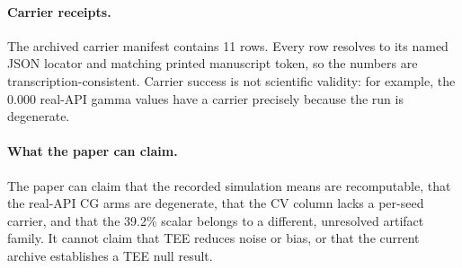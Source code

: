 \paragraph{Carrier receipts.}
The archived carrier manifest contains 11 rows. Every row resolves to its named
JSON locator and matching printed manuscript token, so the numbers are
transcription-consistent. Carrier success is not scientific validity: for
example, the $0.000$ real-API gamma values have a carrier precisely because the
run is degenerate.

\paragraph{What the paper can claim.}
The paper can claim that the recorded simulation means are recomputable, that
the real-API CG arms are degenerate, that the CV column lacks a per-seed
carrier, and that the 39.2\% scalar belongs to a different, unresolved artifact
family. It cannot claim that TEE reduces noise or bias, or that the current
archive establishes a TEE null result.
